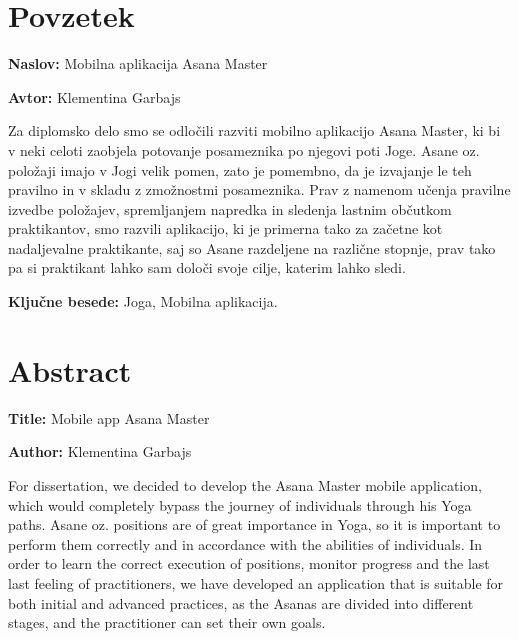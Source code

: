 \documentclass[a4paper, 12pt]{book}
\newcommand{\ttitle}{Mobilna aplikacija Asana Master}
\newcommand{\ttitleEn}{Mobile app Asana Master}
\newcommand{\tauthor}{Klementina Garbajs}
\newcommand{\tkeywords}{Joga, Mobilna aplikacija}
\newcommand{\clearemptydoublepage}{\newpage{\pagestyle{empty}\cleardoublepage}}
\begin{document}
\clearemptydoublepage

\chapter*{Povzetek}

\noindent\textbf{Naslov:} \ttitle
\bigskip

\noindent\textbf{Avtor:} \tauthor
\bigskip

\noindent 
Za diplomsko delo smo se odločili razviti mobilno aplikacijo Asana Master, ki bi v neki celoti zaobjela potovanje posameznika po njegovi poti Joge. Asane oz. položaji imajo v Jogi velik pomen, zato je pomembno, da je izvajanje le teh pravilno in v skladu z zmožnostmi posameznika. Prav z namenom učenja pravilne izvedbe položajev, spremljanjem napredka in sledenja lastnim občutkom praktikantov, smo razvili aplikacijo, ki je primerna tako za začetne kot nadaljevalne praktikante, saj so Asane razdeljene na različne stopnje, prav tako pa si praktikant lahko sam določi svoje cilje, katerim lahko sledi. 

\bigskip

\noindent\textbf{Ključne besede:} \tkeywords.
\clearemptydoublepage

\chapter*{Abstract}

\noindent\textbf{Title:} \ttitleEn
\bigskip

\noindent\textbf{Author:} \tauthor
\bigskip

\noindent 

For dissertation, we decided to develop the Asana Master mobile application, which would completely bypass the journey of individuals through his Yoga paths. Asane oz. positions are of great importance in Yoga, so it is important to perform them correctly and in accordance with the abilities of individuals. In order to learn the correct execution of positions, monitor progress and the last last feeling of practitioners, we have developed an application that is suitable for both initial and advanced practices, as the Asanas are divided into different stages, and the practitioner can set their own goals.
\bigskip
\end{document}
